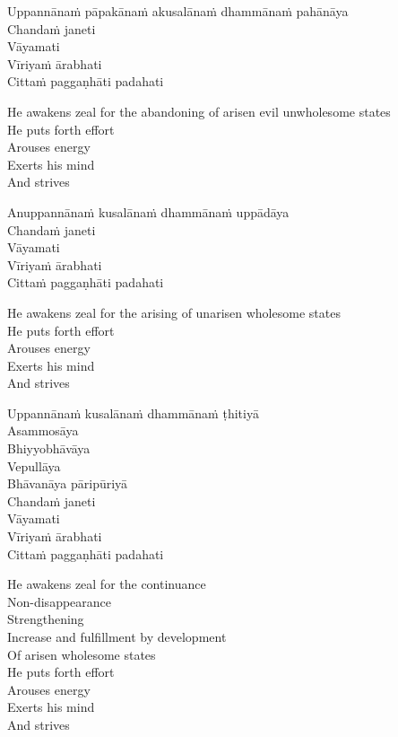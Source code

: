Uppannānaṁ pāpakānaṁ akusalānaṁ dhammānaṁ pahānāya\\
Chandaṁ janeti\\
Vāyamati\\
Vīriyaṁ ārabhati\\
Cittaṁ paggaṇhāti padahati

\begin{english}
  He awakens zeal for the abandoning of arisen evil unwholesome states\\
  He puts forth effort\\
  Arouses energy\\
  Exerts his mind\\
  And strives
\end{english}

Anuppannānaṁ kusalānaṁ dhammānaṁ uppādāya\\
Chandaṁ janeti\\
Vāyamati\\
Vīriyaṁ ārabhati\\
Cittaṁ paggaṇhāti padahati

\begin{english}
  He awakens zeal for the arising of unarisen wholesome states\\
  He puts forth effort\\
  Arouses energy\\
  Exerts his mind\\
  And strives
\end{english}

Uppannānaṁ kusalānaṁ dhammānaṁ ṭhitiyā\\
Asammosāya\\
Bhiyyobhāvāya\\
Vepullāya\\
Bhāvanāya pāripūriyā\\
Chandaṁ janeti\\
Vāyamati\\
Vīriyaṁ ārabhati\\
Cittaṁ paggaṇhāti padahati

\begin{english}
  He awakens zeal for the continuance\\
  Non-disappearance\\
  Strengthening\\
  Increase and fulfillment by development\\
  Of arisen wholesome states\\
  He puts forth effort\\
  Arouses energy\\
  Exerts his mind\\
  And strives
\end{english}


